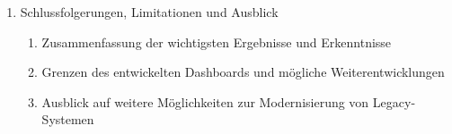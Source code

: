 \begin{enumerate}
\begin{enumerate}
\begin{enumerate}
            \item Auswertung der Nutzerbefragung zur Bewertung der User-Experience des Dashboards
        \end{enumerate}
        \item Kritische Auseinandersetzung mit der verwendeten Methodik zur Modernisierung von Legacy-Systemen
        \item Kritische Auseinandersetzung mit der verwendeten Methodik zur Validierung der gewählten Dashboard-Lösung
        \item Abschließende Bewertung der Dashboard-Lösung zur Modernisierung eines Legacy-Systems
    \end{enumerate}
    \item Schlussfolgerungen, Limitationen und Ausblick
    \begin{enumerate}
        \item Zusammenfassung der wichtigsten Ergebnisse und Erkenntnisse
        \item Grenzen des entwickelten Dashboards und mögliche Weiterentwicklungen
        \item Ausblick auf weitere Möglichkeiten zur Modernisierung von Legacy-Systemen
    \end{enumerate}
\end{enumerate}
